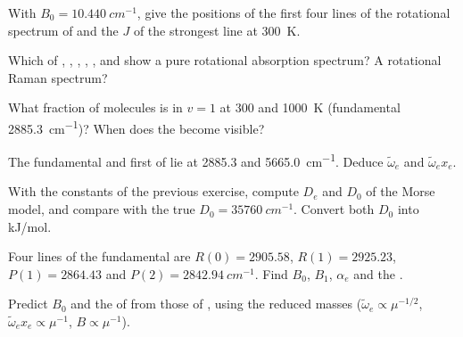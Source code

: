 \begin{exercise}[$\star$]\label{exo:b3:rovibrational-spectroscopy:2}
With $B_0 = \qty{10.440}{cm^{-1}}$, give the positions of the first four lines of
the rotational spectrum of  and the $J$ of the strongest line at
\qty{300}{K}.
\end{exercise}

\begin{exercise}[$\star$]\label{exo:b3:rovibrational-spectroscopy:3}
Which of , , , , ,  and  show a pure
rotational absorption spectrum? A rotational Raman spectrum?
\end{exercise}

\begin{exercise}[$\star$]\label{exo:b3:rovibrational-spectroscopy:4}
What fraction of  molecules is in $v = 1$ at 300 and \qty{1000}{K}
(fundamental \qty{2885.3}{cm^{-1}})? When does the  become visible?
\end{exercise}

\begin{exercise}[$\star\star$]\label{exo:b3:rovibrational-spectroscopy:5}
The fundamental and first  of  lie at 2885.3 and
\qty{5665.0}{cm^{-1}}. Deduce $\tilde\omega_e$ and $\tilde\omega_ex_e$.
\end{exercise}

\begin{exercise}[$\star\star$]\label{exo:b3:rovibrational-spectroscopy:6}
With the constants of the previous exercise, compute $D_e$ and $D_0$ of the
Morse model, and compare with the true $D_0 = \qty{35760}{cm^{-1}}$. Convert both
$D_0$ into \unit{kJ/mol}.
\end{exercise}

\begin{exercise}[$\star\star$]\label{exo:b3:rovibrational-spectroscopy:7}
Four lines of the  fundamental are $R(0) = 2905.58$, $R(1) = 2925.23$,
$P(1) = 2864.43$ and $P(2) = \qty{2842.94}{cm^{-1}}$. Find $B_0$, $B_1$, $\alpha_e$ and
the .
\end{exercise}

\begin{exercise}[$\star\star$]\label{exo:b3:rovibrational-spectroscopy:8}
Predict $B_0$ and the  of  from those of , using
the reduced masses ($\tilde\omega_e \propto \mu^{-1/2}$, $\tilde\omega_ex_e \propto
\mu^{-1}$, $B \propto \mu^{-1}$).
\end{exercise}

